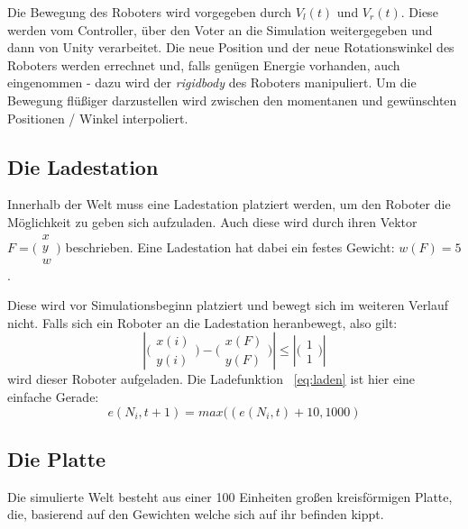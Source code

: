 Die Bewegung des Roboters wird vorgegeben durch $V_l(t)$ und $ V_r(t)$. Diese werden vom Controller, {\"{u}}ber den Voter an die Simulation
weitergegeben und dann von Unity verarbeitet. Die neue Position und der neue Rotationswinkel des Roboters werden errechnet und,
falls gen{\"{u}}gen Energie vorhanden, auch eingenommen - dazu wird der \textit{rigidbody} des Roboters manipuliert.
Um die Bewegung fl{\"{u}}{\ss}iger darzustellen wird zwischen den momentanen und gew{\"{u}}nschten Positionen / Winkel interpoliert.


\subsection{Die Ladestation}\label{fuelstation}
Innerhalb der Welt muss eine Ladestation platziert werden, um den Roboter die M{\"{o}}glichkeit zu geben sich aufzuladen. Auch diese wird durch ihren Vektor $ F = \bigl(\begin{smallmatrix} x \\ y \\ w \end{smallmatrix}\bigr)$ beschrieben. Eine Ladestation hat dabei ein festes Gewicht: $ w(F) = 5 $.

Diese wird vor Simulationsbeginn platziert und bewegt sich im weiteren Verlauf nicht.
Falls sich ein Roboter an die Ladestation heranbewegt, also gilt: 
\begin{equation}\label{eq:dist}
 |\bigl(\begin{smallmatrix} x(i) \\ y(i) \end{smallmatrix}\bigr) - \bigl(\begin{smallmatrix} x(F) \\ y(F) \end{smallmatrix}\bigr)| \leq |\bigl(\begin{smallmatrix} 1 \\ 1 \end{smallmatrix}\bigr)|
\end{equation}
wird dieser Roboter aufgeladen. Die Ladefunktion ~\ref{eq:laden} ist hier eine einfache Gerade:
\begin{equation}
    \label{eq:laden}
	e(N_i, t + 1) = max((e(N_i, t) + 10, 1000) 
\end{equation}

\subsection{Die Platte}\label{plate}
Die simulierte Welt besteht aus einer 100 Einheiten gro{\ss}en kreisf{\"{o}}rmigen Platte, die, basierend auf den Gewichten welche sich auf ihr befinden kippt.

